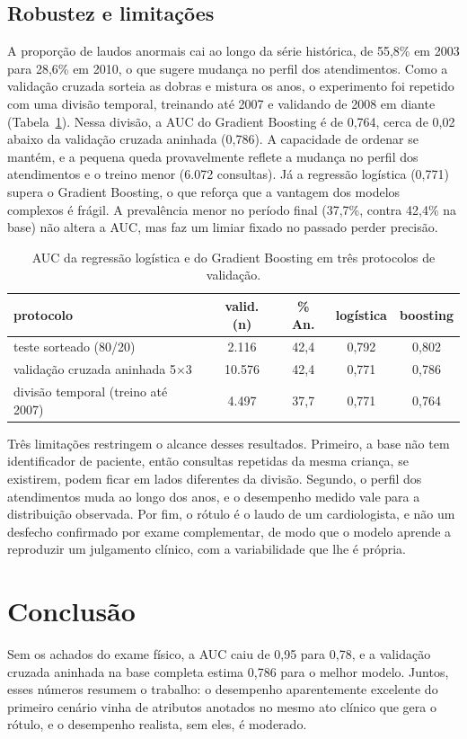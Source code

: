\documentclass[conference]{IEEEtran}
\begin{document}
\subsection{Robustez e limitações}
A proporção de laudos anormais cai ao longo da série histórica, de 55,8\% em 2003 para 28,6\% em 2010, o que sugere mudança no perfil dos atendimentos. Como a validação cruzada sorteia as dobras e mistura os anos, o experimento foi repetido com uma divisão temporal, treinando até 2007 e validando de 2008 em diante (Tabela~\ref{tab:temporal}). Nessa divisão, a AUC do Gradient Boosting é de 0,764, cerca de 0,02 abaixo da validação cruzada aninhada (0,786). A capacidade de ordenar se mantém, e a pequena queda provavelmente reflete a mudança no perfil dos atendimentos e o treino menor (6.072 consultas). Já a regressão logística (0,771) supera o Gradient Boosting, o que reforça que a vantagem dos modelos complexos é frágil. A prevalência menor no período final (37,7\%, contra 42,4\% na base) não altera a AUC, mas faz um limiar fixado no passado perder precisão.

\begin{table}[!t]
\caption{AUC da regressão logística e do Gradient Boosting em três protocolos de validação.}
\label{tab:temporal}
\centering
\footnotesize
\setlength{\tabcolsep}{3pt}
\begin{tabular}{>{\raggedright\arraybackslash}p{3.0cm}cccc}
\toprule
protocolo & valid. (n) & \% An. & logística & boosting \\
\midrule
teste sorteado (80/20) & 2.116 & 42,4 & 0,792 & 0,802 \\
validação cruzada aninhada 5$\times$3 & 10.576 & 42,4 & 0,771 & 0,786 \\
divisão temporal (treino até 2007) & 4.497 & 37,7 & 0,771 & 0,764 \\
\bottomrule
\end{tabular}
\end{table}

Três limitações restringem o alcance desses resultados. Primeiro, a base não tem identificador de paciente, então consultas repetidas da mesma criança, se existirem, podem ficar em lados diferentes da divisão. Segundo, o perfil dos atendimentos muda ao longo dos anos, e o desempenho medido vale para a distribuição observada. Por fim, o rótulo é o laudo de um cardiologista, e não um desfecho confirmado por exame complementar, de modo que o modelo aprende a reproduzir um julgamento clínico, com a variabilidade que lhe é própria.

\section{Conclusão}
Sem os achados do exame físico, a AUC caiu de 0,95 para 0,78, e a validação cruzada aninhada na base completa estima 0,786 para o melhor modelo. Juntos, esses números resumem o trabalho: o desempenho aparentemente excelente do primeiro cenário vinha de atributos anotados no mesmo ato clínico que gera o rótulo, e o desempenho realista, sem eles, é moderado.
\end{document}
